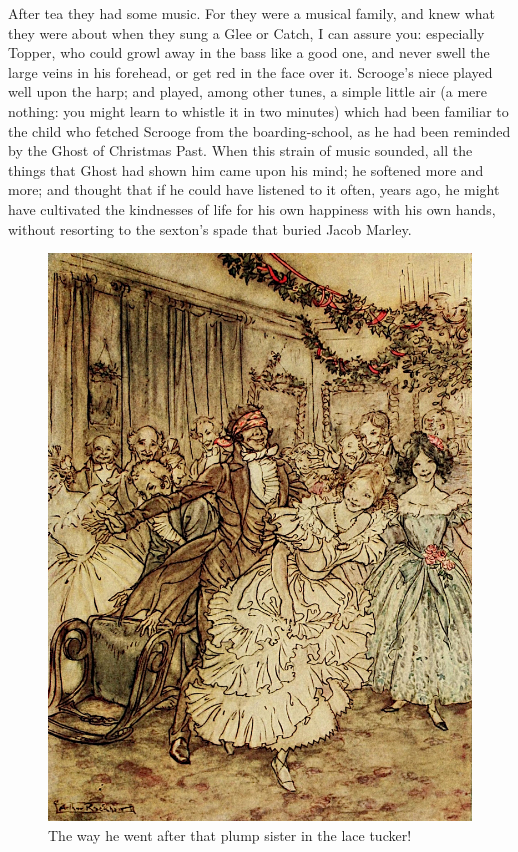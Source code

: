 \documentclass[paper=a5,BCOR=15mm,twoside,DIV=15,headinclude=off,12pt,chapterprefix=off,openany,headings=huge]{scrbook} %
\begin{document}
After tea they had some music. For they were a musical family, and knew what they were about when they sung a Glee or Catch, I can assure you: especially Topper, who could growl away in the bass like a good one, and never swell the large veins in his forehead, or get red in the face over it. Scrooge's niece played well upon the harp; and played, among other tunes, a simple little air (a mere nothing: you might learn to whistle it in two minutes) which had been familiar to the child who fetched Scrooge from the boarding-school, as he had been reminded by the Ghost of Christmas Past. When this strain of music sounded, all the things that Ghost had shown him came upon his mind; he softened more and more; and thought that if he could have listened to it often, years ago, he might have cultivated the kindnesses of life for his own happiness with his own hands, without resorting to the sexton's spade that buried Jacob Marley.

\begin{figure}[p]
\begin{minipage}[c]{\linewidth}
\includegraphics[width=\linewidth]{fredpartyimproved}
\caption*{The way he went after that plump sister in the lace tucker!}
\end{minipage}
\end{figure}
\end{document}

